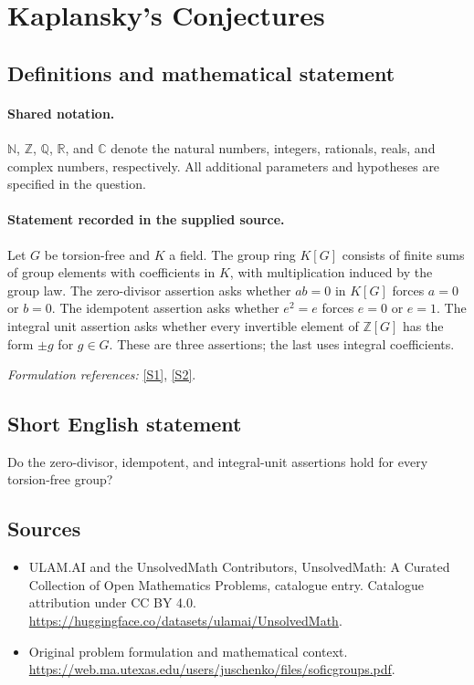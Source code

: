 \documentclass[11pt]{article}
\newcommand{\sref}[2]{\hyperlink{source:#1:#2}{[S#2]}}
\begin{document}
\section{Kaplansky's Conjectures}\label{statement}

\subsection{Definitions and mathematical statement}

\paragraph{Shared notation.}$\mathbb N$, $\mathbb Z$, $\mathbb Q$, $\mathbb R$, and $\mathbb C$ denote the natural numbers, integers, rationals, reals, and complex numbers, respectively. All additional parameters and hypotheses are specified in the question.


\paragraph{Statement recorded in the supplied source.}
Let $G$ be torsion-free and $K$ a field. The group ring $K[G]$ consists of finite sums of group elements with coefficients in $K$, with multiplication induced by the group law. The zero-divisor assertion asks whether $ab=0$ in $K[G]$ forces $a=0$ or $b=0$. The idempotent assertion asks whether $e^2=e$ forces $e=0$ or $e=1$. The integral unit assertion asks whether every invertible element of $\mathbb Z[G]$ has the form $\pm g$ for $g\in G$. These are three assertions; the last uses integral coefficients.
\par\smallskip\textit{Formulation references:} \sref{statement}{1}, \sref{statement}{2}.
\subsection{Short English statement}
Do the zero-divisor, idempotent, and integral-unit assertions hold for every torsion-free group?
\subsection{Sources}
\begin{itemize}
\item[\hypertarget{source:statement:1}{S1}] ULAM.AI and the UnsolvedMath Contributors, UnsolvedMath: A Curated Collection of Open Mathematics Problems, catalogue entry. Catalogue attribution under CC BY 4.0.
\url{https://huggingface.co/datasets/ulamai/UnsolvedMath}.
\item[\hypertarget{source:statement:2}{S2}] Original problem formulation and mathematical context.
\url{https://web.ma.utexas.edu/users/juschenko/files/soficgroups.pdf}.
\end{itemize}
\label{end:statement}
\end{document}
